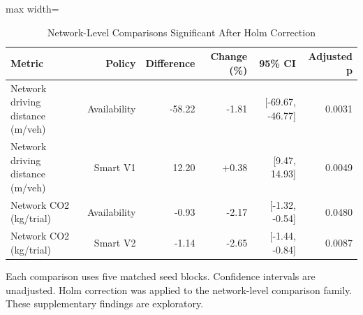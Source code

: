 \begin{table}[t]
\centering
\caption{Network-Level Comparisons Significant After Holm Correction}
\label{tab:network_statistical_tests}
\small
\setlength{\tabcolsep}{4pt}
\begin{adjustbox}{max width=\textwidth}

\begin{tabular}{lrrrrr}
\toprule
Metric & Policy & Difference & Change (\%) & 95\% CI & Adjusted p\\
\midrule
Network driving distance (m/veh) & Availability & -58.22 & -1.81 & {}[-69.67, -46.77] & 0.0031\\
Network driving distance (m/veh) & Smart V1 & 12.20 & +0.38 & {}[9.47, 14.93] & 0.0049\\
Network CO2 (kg/trial) & Availability & -0.93 & -2.17 & {}[-1.32, -0.54] & 0.0480\\
Network CO2 (kg/trial) & Smart V2 & -1.14 & -2.65 & {}[-1.44, -0.84] & 0.0087\\
\bottomrule
\end{tabular}
\end{adjustbox}
\par\smallskip
\begin{minipage}{\textwidth}
\footnotesize
Each comparison uses five matched seed blocks. Confidence intervals are unadjusted. Holm correction was applied to the network-level comparison family. These supplementary findings are exploratory.
\end{minipage}
\end{table}

